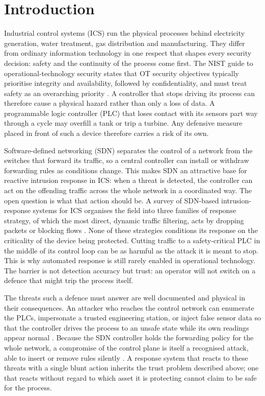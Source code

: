 \chapter{Introduction}
\label{chap:introduction}

\noindent
Industrial control systems (ICS) run the physical processes behind electricity generation, water treatment, gas distribution and manufacturing. They differ from ordinary information technology in one respect that shapes every security decision: safety and the continuity of the process come first. The NIST guide to operational-technology security states that OT security objectives typically prioritise integrity and availability, followed by confidentiality, and must treat safety as an overarching priority \cite{nist80082}. A controller that stops driving its process can therefore cause a physical hazard rather than only a loss of data. A programmable logic controller (PLC) that loses contact with its sensors part way through a cycle may overfill a tank or trip a turbine. Any defensive measure placed in front of such a device therefore carries a risk of its own.

Software-defined networking (SDN) separates the control of a network from the switches that forward its traffic, so a central controller can install or withdraw forwarding rules as conditions change. This makes SDN an attractive base for reactive intrusion response in ICS: when a threat is detected, the controller can act on the offending traffic across the whole network in a coordinated way. The open question is what that action should be. A survey of SDN-based intrusion-response systems for ICS organises the field into three families of response strategy, of which the most direct, dynamic traffic filtering, acts by dropping packets or blocking flows \cite{etxezarreta2023survey}. None of these strategies conditions its response on the criticality of the device being protected. Cutting traffic to a safety-critical PLC in the middle of its control loop can be as harmful as the attack it is meant to stop. This is why automated response is still rarely enabled in operational technology. The barrier is not detection accuracy but trust: an operator will not switch on a defence that might trip the process itself.

The threats such a defence must answer are well documented and physical in their consequences. An attacker who reaches the control network can enumerate the PLCs, impersonate a trusted engineering station, or inject false sensor data so that the controller drives the process to an unsafe state while its own readings appear normal \cite{etxezarreta2026replica}. Because the SDN controller holds the forwarding policy for the whole network, a compromise of the control plane is itself a recognised attack, able to insert or remove rules silently \cite{gardiner2021controller}. A response system that reacts to these threats with a single blunt action inherits the trust problem described above; one that reacts without regard to which asset it is protecting cannot claim to be safe for the process.


